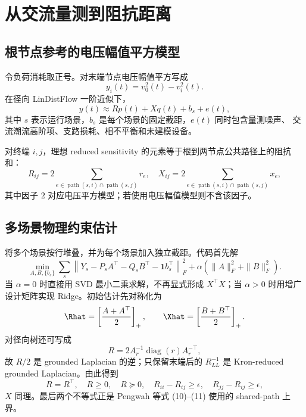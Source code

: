 \section{从交流量测到阻抗距离}

\subsection{根节点参考的电压幅值平方模型}

令负荷消耗取正号。对末端节点电压幅值平方写成
\begin{equation}
  y_i(t)=v_0^2(t)-v_i^2(t).
  \label{eq:drop-target}
\end{equation}
在径向 LinDistFlow 一阶近似下，
\begin{equation}
  y(t)\approx R p(t)+X q(t)+b_s+e(t),
  \label{eq:linear-drop}
\end{equation}
其中 $s$ 表示运行场景，$b_s$ 是每个场景的固定截距，$e(t)$ 同时包含量测噪声、
交流潮流高阶项、支路损耗、相不平衡和未建模设备。

对终端 $i,j$，理想 reduced sensitivity 的元素等于根到两节点公共路径上的阻抗和：
\begin{equation}
  R_{ij}=2\sum_{e\in \operatorname{path}(s,i)\cap
  \operatorname{path}(s,j)}r_e,
  \quad
  X_{ij}=2\sum_{e\in \operatorname{path}(s,i)\cap
  \operatorname{path}(s,j)}x_e,
\end{equation}
其中因子 $2$ 对应电压平方模型；若使用电压幅值模型则不含该因子。

\subsection{多场景物理约束估计}

将多个场景按行堆叠，并为每个场景加入独立截距。代码首先解
\begin{equation}
  \min_{A,B,\{b_s\}}
  \sum_s\left\|Y_s-P_sA^\top-Q_sB^\top
  -\boldsymbol{1}b_s^\top\right\|_F^2
  +\alpha(\|A\|_F^2+\|B\|_F^2).
  \label{eq:multiscenario-regression}
\end{equation}
当 $\alpha=0$ 时直接用 SVD 最小二乘求解，不再显式形成
$X^\top X$；当 $\alpha>0$ 时用增广设计矩阵实现 Ridge。初始估计先对称化为
\begin{equation}
  \Rhat=\left[\frac{A+A^\top}{2}\right]_+,
  \qquad
  \Xhat=\left[\frac{B+B^\top}{2}\right]_+.
  \label{eq:projected-rx}
\end{equation}
对径向树还可写成
\[
R=2A_r^{-1}\operatorname{diag}(r)A_r^{-\top},
\]
故 $R/2$ 是 grounded Laplacian 的逆；只保留末端后的 $R_{LL}^{-1}$
是 Kron-reduced grounded Laplacian。由此得到
\begin{equation}
R=R^\top,\quad R\ge0,\quad R\succeq0,\quad
R_{ii}-R_{ij}\ge\epsilon,\quad R_{jj}-R_{ij}\ge\epsilon,
\label{eq:matrix-constraints}
\end{equation}
$X$ 同理。最后两个不等式正是 Pengwah 等式 (10)--(11) 使用的
shared-path 上界\cite{pengwah2024}。

